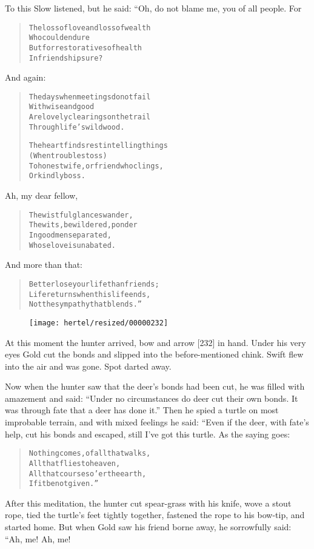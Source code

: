 \documentclass[article, twoside, 10pt]{memoir}
\renewenvironment{verbatim}{%
\begin{quote}%
\vskip -10pt%
\begin{alltt}\normalfont\small}{\end{alltt}%
\end{quote}%
\vskip -10pt
} %
\begin{document}
To this Slow listened, but he said: “Oh, do not blame me, you of
all people. For

\begin{verbatim}
The loss of love and loss of wealth
    Who could endure
But for restoratives of health
    In friendship sure?
\end{verbatim}
And again:

\begin{verbatim}
The days when meetings do not fail
    With wise and good
Are lovely clearings on the trail
    Through life's wild wood.

The heart finds rest in telling things
    (When troubles toss)
To honest wife, or friend who clings,
    Or kindly boss.
\end{verbatim}
Ah, my dear fellow,

\begin{verbatim}
The wistful glances wander,
The wits, bewildered, ponder
In good men separated,
Whose love is unabated.
\end{verbatim}
And more than that:

\begin{verbatim}
Better lose your life than friends;
Life returns when this life ends,
Not the sympathy that blends.”
\end{verbatim}
\begin{figure}[p]\texttt{[image: hertel/resized/00000232]}\end{figure}At this moment the hunter arrived, bow and arrow [232] in hand.
Under his very eyes Gold cut the bonds and slipped into the
before-mentioned chink. Swift flew into the air and was gone. Spot
darted away.

Now when the hunter saw that the deer's bonds had been cut, he was
filled with amazement and said:
``Under no circumstances do deer cut their own bonds. It was through fate that a deer has done it.''
Then he spied a turtle on most improbable terrain, and with mixed
feelings he said: “Even if the deer, with fate's help, cut his
bonds and escaped, still I've got this turtle. As the saying goes:

\begin{verbatim}
Nothing comes, of all that walks,
    All that flies to heaven,
All that courses o'er the earth,
    If it be not given.”
\end{verbatim}
After this meditation, the hunter cut spear-grass with his knife,
wove a stout rope, tied the turtle's feet tightly together,
fastened the rope to his bow-tip, and started home. But when Gold
saw his friend borne away, he sorrowfully said: “Ah, me! Ah, me!
\end{document}
